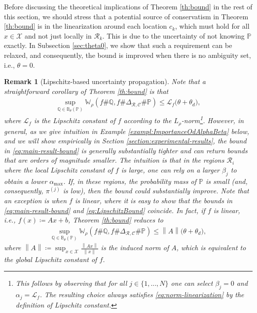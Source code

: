 \documentclass[11pt, a4paper, oneside,reqno]{amsart}
\theoremstyle{plain}
\newtheorem{remark}{Remark}
\def\prob{\mathbb{P}}
\def\probQ{\mathbb{Q}}
\def\wasserstein{{\mathbb{W}}}
\newcommand{\norm}[1]{\left\lVert#1\right\rVert}
\def\sL{{\mathcal{L}}}
\def\sR{{\mathcal{R}}}
\def\sX{{\mathcal{X}}}
\def\bsR{{\bm{\mathcal{R}}}}
\def\bsC{{\bm{\mathcal{C}}}}
\def\vpi{{{\pi}}}
\newcommand{\evpi}[1]{{\vpi^{(#1)}}}
\begin{document}
Before discussing the theoretical implications of Theorem \ref{th:bound} in the rest of this section, we should stress that a potential source of conservatism in Theorem \ref{th:bound} is in the linearization around each location $c_k$, which must hold for all $x\in \sX$ and not just locally in $\sR_k$. This is due to the uncertainty of not knowing $\prob$ exactly. %
In Subsection \ref{sec:theta0}, we show that such a requirement can be relaxed, and consequently, the bound is improved when there is no ambiguity set, i.e., $\theta=0$.

\begin{remark}[Lipschitz-based uncertainty propagation]\label{rem:linearSyst}
Note that a straightforward corollary of Theorem \ref{th:bound} is that
\begin{align}
    \label{eq:LipschitzBound}
   \sup_{\probQ \in \mathbb{B}_\theta(\prob)} \wasserstein_\rho(f\#\probQ, f\#\Delta_{\bsR, \bsC}\#\prob) \leq \sL_f \big( \theta+\theta_d \big),
\end{align}
where $\sL_f$ is the Lipschitz constant of $f$ according to the $L_\rho$-norm\footnote{This follows by  observing that for all $j\in\{1,...,N\}$ one can select $\beta_j=0$  and $\alpha_j=\sL_f$. The resulting choice always satisfies \eqref{eq:norm-linearization} by the definition of Lipschitz constant.}.
However, in general, as we give intuition in Example \ref{exampl:ImportanceOdAlphaBeta} below, and we will show empirically in Section \ref{section:experimental-results}, the bound in \eqref{eq:main-result-bound} is generally substantially tighter and can return bounds that are orders of magnitude smaller. The intuition is that in the regions $\mathcal{R}_i$ where the local Lipschitz constant of $f$ is large, one can rely on a larger $\beta_j$ to obtain a lower $\alpha_{\max}$. If, in these regions, the probability mass of $\prob$ is small (and, consequently, $\evpi{j}$ is low), then the bound could substantially improve.  
Note that an exception is when $f$ is linear, where it is easy to show that the bounds in \eqref{eq:main-result-bound} and \eqref{eq:LipschitzBound} coincide.
In fact,  if  $f$ is  linear, i.e., $f(x) \coloneqq Ax + b$, Theorem \ref{th:bound} reduces to
   \begin{align}
   \label{eqn:LinearCase}
   \sup_{\probQ \in \mathbb{B}_\theta(\prob)} \wasserstein_\rho(f\#\probQ, f\#\Delta_{\bsR, \bsC}\#\prob) \leq \norm{A} \big( \theta+\theta_d \big),
   \end{align}
   where $\norm{A} \coloneqq \sup_{x \in \sX} \frac{\norm{Ax}}{\norm{x}}$ is the induced norm of $A$, which is equivalent to the global Lipschitz constant of $f$. %
\end{remark}
\end{document}
